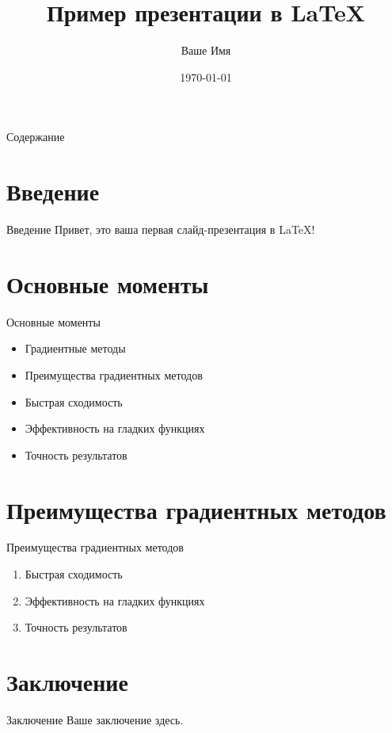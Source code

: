 \documentclass{beamer}
\title{Пример презентации в LaTeX}
\author{Ваше Имя}
\date{\today}
\begin{document}
\begin{frame}
  \titlepage
\end{frame}

\begin{frame}{Содержание}
  \tableofcontents
\end{frame}

\section{Введение}
\begin{frame}{Введение}
  Привет, это ваша первая слайд-презентация в LaTeX!
\end{frame}

\section{Основные моменты}
\begin{frame}{Основные моменты}
  \begin{itemize}
    \item Градиентные методы
    \item Преимущества градиентных методов
    \item Быстрая сходимость
    \item Эффективность на гладких функциях
    \item Точность результатов
  \end{itemize}
\end{frame}

\section{Преимущества градиентных методов}
\begin{frame}{Преимущества градиентных методов}
  \begin{enumerate}
    \item Быстрая сходимость
    \item Эффективность на гладких функциях
    \item Точность результатов
  \end{enumerate}
\end{frame}

\section{Заключение}
\begin{frame}{Заключение}
  Ваше заключение здесь.
\end{frame}
\end{document}
